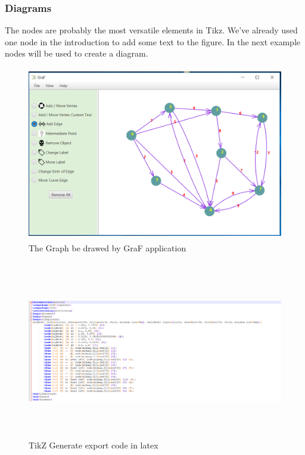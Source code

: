 \documentclass[a4paper,10pt]{article}
\begin{document}
\subsubsection{Diagrams}
The nodes are probably the most versatile elements in Tikz. We've already used one node in the introduction to add some text to the figure. In the next example nodes will be used to create a diagram.
\begin{figure}[H]
		\centering
		\includegraphics[height = 3in]{graph_tkz.png}
		\caption[Optional caption]{The Graph be drawed by GraF application}
		\label{fig:Repository}
	\end{figure}
\paragraph{}
\begin{figure}[H]
		\centering
		\includegraphics[height = 3in]{tikz_code_export.png}
		\caption[Optional caption]{TikZ Generate export code in latex}
		\label{fig:Repository}
	\end{figure}
\end{document}
